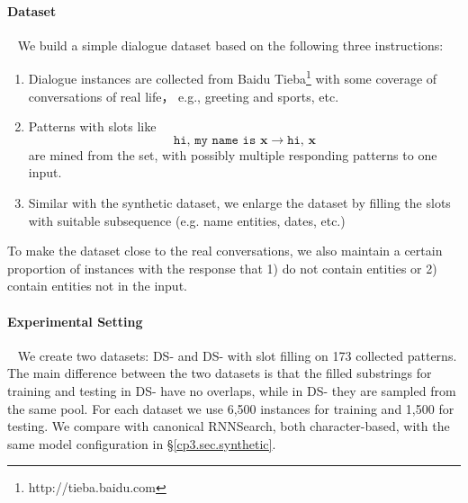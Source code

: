\paragraph{Dataset}~ 
 We build a simple dialogue dataset based on the following three instructions: 
  \begin{enumerate}
	\item Dialogue instances are collected from Baidu Tieba\footnote{http://tieba.baidu.com} with some coverage of conversations of real life， e.g., greeting and sports, etc.
	\item Patterns with slots like
	\[\texttt{hi, my name is } \mathbf{x}\rightarrow \texttt{hi, } \mathbf{x} 	 \]   
	are mined from the set, with possibly multiple responding patterns to one input.
	\item Similar with the synthetic dataset, we enlarge the dataset by filling the slots with suitable subsequence (e.g. name entities, dates, etc.)
\end{enumerate} 
To make the dataset close to the real conversations, we also maintain a certain proportion of instances with the response that 1) do not contain entities or 2) contain entities not in the input.  

\paragraph{Experimental Setting}~ We create two datasets: DS-\uppercase\expandafter{} and DS-\uppercase\expandafter{} with slot filling on 173 collected patterns. The main difference between the two datasets is that the filled substrings for training and testing in DS-\uppercase\expandafter{} have no overlaps, while in DS-\uppercase\expandafter{} they are sampled from the same pool. For each dataset we use 6,500 instances for training and 1,500 for testing. We compare \copynet with canonical RNNSearch, both character-based, with the same model configuration in \S\ref{cp3.sec.synthetic}. 

